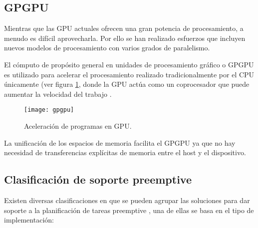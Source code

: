     \subsection{GPGPU}
    
    Mientras que las GPU actuales ofrecen una gran potencia de procesamiento, a menudo es difícil aprovecharla. Por ello se han realizado esfuerzos que incluyen nuevos modelos de procesamiento con varios grados de paralelismo.
    \newline
   
    El cómputo de propósito general en unidades de procesamiento gráfico o GPGPU es utilizado para acelerar el procesamiento realizado tradicionalmente por el CPU únicamente (ver figura \ref{fig:gpgpu}, donde la GPU actúa como un coprocesador que puede aumentar la velocidad del trabajo \cite{GpuCpu}.
    \newline
    
     \begin{figure}[!h]
      \centering
        \texttt{[image: gpgpu]}
        \caption{Aceleración de programas en GPU\cite{gpgpu}.}
        \label{fig:gpgpu}
    \end{figure}
   
    La unificación de los espacios de memoria facilita el GPGPU ya que no hay necesidad de transferencias explícitas de memoria entre el host y el dispositivo.

\subsection{Clasificación de soporte preemptive}

\label{claspree}
Existen diversas clasificaciones en que se pueden agrupar las soluciones para dar soporte a la planificación de tareas preemptive \cite{GPUArt,DynSche,GPES,RGEM}, una de ellas se basa en el tipo de implementación:

